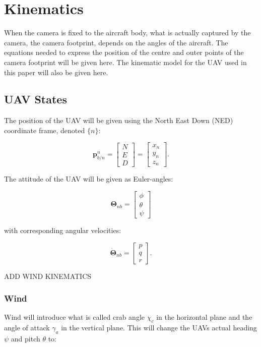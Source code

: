 \section{Kinematics}

When the camera is fixed to the aircraft body, what is actually captured by the camera, the camera footprint, depends on the angles of the aircraft. The equations needed to express the position of the centre and outer points of the camera footprint will be given here. The kinematic model for the UAV used in this paper will also be given here.


\subsection{UAV States}

The position of the UAV will be given using the North East Down (NED) coordinate frame, denoted $\{n\}$:

\begin{equation}
	\mathbf{p}_{b/n}^n =
	\begin{bmatrix}
		N \\ E \\ D
	\end{bmatrix}
	=
	\begin{bmatrix}
		x_n \\ y_n \\ z_n
	\end{bmatrix}.
\end{equation}

The attitude of the UAV will be given as Euler-angles:

\begin{equation}
	\bm{\Theta}_{nb} =
	\begin{bmatrix}
		\phi \\ \theta \\ \psi
	\end{bmatrix}	
\end{equation}

with corresponding angular velocities:

\begin{equation}
	\dot{\bm{\Theta}}_{nb} =
	\begin{bmatrix}
		p \\ q \\ r
	\end{bmatrix}.
\end{equation}

ADD WIND KINEMATICS

\subsubsection*{Wind}
Wind will introduce what is called crab angle $\chi_c$ in the horizontal plane and the angle of attack $\gamma_a$ in the vertical plane. This will change the UAVs actual heading $\psi$ and pitch $\theta$ to:

